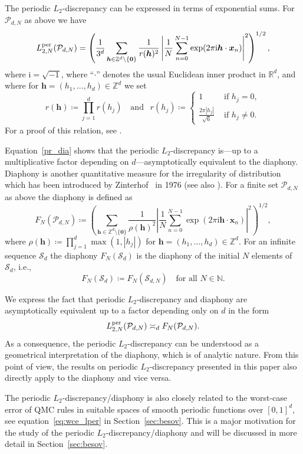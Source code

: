 \documentclass[12pt, a4paper]{article}
\def\P{\mathcal{P}}
\def\S{\mathcal{S}}
\newcommand{\bsx}{{\boldsymbol{x}}}
\newcommand{\bsh}{{\boldsymbol{h}}}
\newcommand{\ZZ}{{\mathbb{Z}}} %
\newcommand{\bszero}{{\boldsymbol{0}}} %
\newcommand{\RR}{{\mathbb{R}}} %
\newcommand{\icomp}{\mathrm{i}}
\newcommand{\NN}{{\mathbb{N}}} %
\begin{document}
The periodic $L_2$-discrepancy can be expressed in terms of exponential sums. For $\P_{d,N}$ as above we have
\begin{equation}\label{pr_dia}
L_{2,N}^{{\rm per}}(\P_{d,N})=\left(\frac{1}{3^d} \sum_{\bsh \in \ZZ^d\setminus\{\bszero\}} \frac{1}{r(\bsh)^2} \left|\frac{1}{N} \sum_{n=0}^{N-1} \exp(2 \pi \icomp \bsh \cdot \bsx_n)\right|^2\right)^{1/2},
\end{equation} 
where $\icomp=\sqrt{-1}$, where ``$\cdot$'' denotes the usual Euclidean inner product in $\RR^d$, and where for $\bsh=(h_1,\ldots,h_d)\in \ZZ^d$ we set 
\begin{equation*}
r(\bsh)\coloneqq \prod_{j=1}^d r(h_j) \ \ \ \mbox{ and } \ \ r(h_j)\coloneqq \left\{ 
\begin{array}{ll}
1 & \mbox{ if $h_j=0$},\\
\frac{2 \pi |h_j|}{\sqrt{6}} & \mbox{ if $h_j\not=0$.} 
\end{array}\right.
\end{equation*}
For a proof of this relation, see \cite[Theorem~1]{Lev}. %

Equation~\eqref{pr_dia} shows that the periodic $L_2$-discrepancy is---up to a multiplicative factor depending on $d$---asymptotically equivalent to the diaphony. Diaphony is another quantitative measure for the irregularity of distribution which has been introduced by Zinterhof~\cite{zint} in 1976 (see also \cite{DT97}). For a finite set $\P_{d,N}$ as above the diaphony is defined as $$F_N(\P_{d,N})\coloneqq \left(\sum_{\bsh \in \ZZ^d\setminus\{\bszero\}} \frac{1}{\rho(\bsh)^2} \left|\frac{1}{N} \sum_{n=0}^{N-1} \exp(2 \pi \icomp \bsh \cdot \bsx_n)\right|^2\right)^{1/2},$$ where $\rho(\bsh)\coloneqq \prod_{j=1}^d \max(1,|h_j|)$ for $\bsh=(h_1,\ldots,h_d) \in \ZZ^d$. For an infinite sequence $\S_d$ the diaphony $F_N(\S_d)$ is the diaphony of the initial $N$ elements of $\S_d$, i.e., $$F_N(\S_d)\coloneqq F_N(\S_{d,N})\quad \mbox{for all } N \in \NN.$$ 

We express the fact that periodic $L_2$-discrepancy and diaphony are asymptotically equivalent up to a factor depending only on $d$ in the form $$L_{2,N}^{{\rm per}}(\P_{d,N})  \asymp_d F_N(\P_{d,N}).$$ As a consequence, the periodic $L_2$-discrepancy can be understood as a geometrical interpretation of the diaphony, which is of analytic nature. From this point of view, the results on periodic $L_2$-discrepancy presented in this paper also directly apply to the diaphony and vice versa.

The periodic $L_2$-discrepancy/diaphony is also closely related to the worst-case error of QMC rules in suitable spaces of smooth periodic functions over $[0,1]^d$, see equation~\eqref{eq:wce_lper} in Section~\ref{sec:besov}. This is a major motivation for the study of the periodic $L_2$-discrepancy/diaphony and will be discussed in more detail in Section~\ref{sec:besov}.\\
\end{document}
